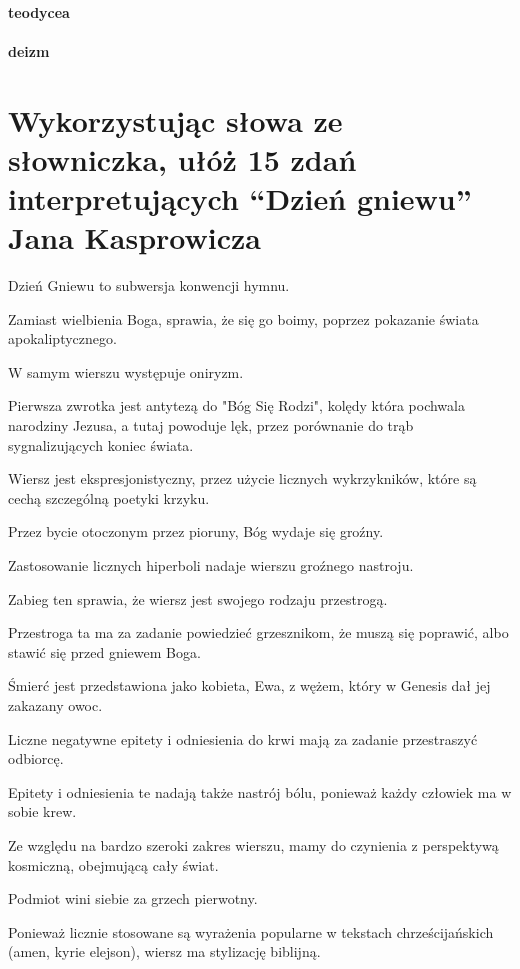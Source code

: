 \documentclass{article}
\begin{document}
    \paragraph*{teodycea}
    \paragraph*{deizm}
\section{Wykorzystując słowa ze słowniczka, ułóż 15 zdań interpretujących ``Dzień gniewu'' Jana Kasprowicza}
Dzień Gniewu to subwersja konwencji hymnu.

Zamiast wielbienia Boga, sprawia, że się go boimy, poprzez pokazanie świata apokaliptycznego.

W samym wierszu występuje oniryzm.

Pierwsza zwrotka jest antytezą do "Bóg Się Rodzi", kolędy która pochwala narodziny Jezusa, a tutaj powoduje lęk, przez porównanie do trąb sygnalizujących koniec świata.

Wiersz jest ekspresjonistyczny, przez użycie licznych wykrzykników, które są cechą szczególną poetyki krzyku.

Przez bycie otoczonym przez pioruny, Bóg wydaje się groźny.

Zastosowanie licznych hiperboli nadaje wierszu groźnego nastroju.

Zabieg ten sprawia, że wiersz jest swojego rodzaju przestrogą.

Przestroga ta ma za zadanie powiedzieć grzesznikom, że muszą się poprawić, albo stawić się przed gniewem Boga.

Śmierć jest przedstawiona jako kobieta, Ewa, z wężem, który w Genesis dał jej zakazany owoc.

Liczne negatywne epitety i odniesienia do krwi mają za zadanie przestraszyć odbiorcę.

Epitety i odniesienia te nadają także nastrój bólu, ponieważ każdy człowiek ma w sobie krew.

Ze względu na bardzo szeroki zakres wierszu, mamy do czynienia z perspektywą kosmiczną, obejmującą cały świat.

Podmiot wini siebie za grzech pierwotny.

Ponieważ licznie stosowane są wyrażenia popularne w tekstach chrześcijańskich (amen, kyrie elejson), wiersz ma stylizację biblijną.
\end{document}
